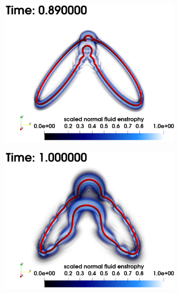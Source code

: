 \documentclass[%
 reprint,
 amsmath,amssymb,
 aps,
 prl,
]{revtex4-2}
\begin{document}
\begin{figure}[t]
\begin{subfigure}[b]{0.24\textwidth}
		\centering
		\includegraphics*[width=\textwidth]{snap-3.png}
	\end{subfigure}
    \begin{subfigure}[b]{0.24\textwidth}
		\centering
		\includegraphics*[width=\textwidth]{snap-4.png}
	\end{subfigure}
    \hfill
    \vspace{0.5cm}
	\begin{subfigure}[b]{0.24\textwidth}
		\centering

\end{subfigure}
\end{figure}
\end{document}
